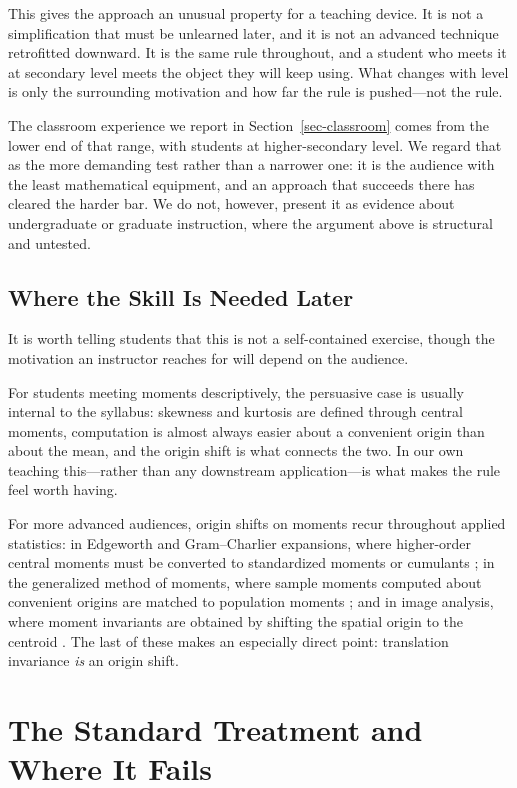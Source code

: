 \documentclass[
  12pt]{article}
\begin{document}
This gives the approach an unusual property for a teaching device. It is not a simplification that must be unlearned later, and it is not an advanced technique retrofitted downward. It is the same rule throughout, and a student who meets it at secondary level meets the object they will keep using. What changes with level is only the surrounding motivation and how far the rule is pushed---not the rule.

The classroom experience we report in Section~\ref{sec-classroom} comes from the lower end of that range, with students at higher-secondary level. We regard that as the more demanding test rather than a narrower one: it is the audience with the least mathematical equipment, and an approach that succeeds there has cleared the harder bar. We do not, however, present it as evidence about undergraduate or graduate instruction, where the argument above is structural and untested.

\subsection{Where the Skill Is Needed Later}

It is worth telling students that this is not a self-contained exercise, though the motivation an instructor reaches for will depend on the audience.

For students meeting moments descriptively, the persuasive case is usually internal to the syllabus: skewness and kurtosis are defined through central moments, computation is almost always easier about a convenient origin than about the mean, and the origin shift is what connects the two. In our own teaching this---rather than any downstream application---is what makes the rule feel worth having.

For more advanced audiences, origin shifts on moments recur throughout applied statistics: in Edgeworth and Gram--Charlier expansions, where higher-order central moments must be converted to standardized moments or cumulants \citep{hall1992, blinnikov1998}; in the generalized method of moments, where sample moments computed about convenient origins are matched to population moments \citep{hansen1982}; and in image analysis, where moment invariants are obtained by shifting the spatial origin to the centroid \citep{hu1962, mukundan1998}. The last of these makes an especially direct point: translation invariance \emph{is} an origin shift.

\section{The Standard Treatment and Where It Fails}\label{sec-traditional}
\end{document}
